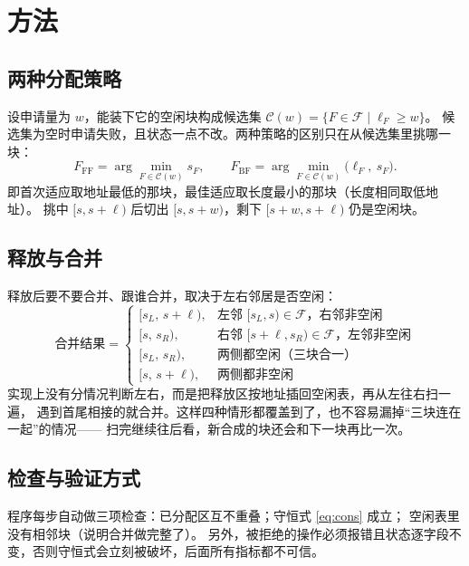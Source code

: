 \documentclass[12pt,a4paper]{ctexart}
\begin{document}
\clearpage
\section{方法}

\subsection{两种分配策略}

设申请量为 $w$，能装下它的空闲块构成候选集
$\mathcal{C}(w)=\{F\in\mathcal{F}\mid \ell_F\ge w\}$。
候选集为空时申请失败，且状态一点不改。两种策略的区别只在从候选集里挑哪一块：
\begin{equation}
    F_{\mathrm{FF}} = \arg\min_{F\in\mathcal{C}(w)} s_F ,
    \qquad
    F_{\mathrm{BF}} = \arg\min_{F\in\mathcal{C}(w)} \bigl(\ell_F,\ s_F\bigr).
    \label{eq:rule}
\end{equation}
即首次适应取地址最低的那块，最佳适应取长度最小的那块（长度相同取低地址）。
挑中 $[s,s+\ell)$ 后切出 $[s,s+w)$，剩下 $[s+w,s+\ell)$ 仍是空闲块。

\subsection{释放与合并}

释放后要不要合并、跟谁合并，取决于左右邻居是否空闲：
\begin{equation}
\text{合并结果} =
\begin{cases}
[s_{L},\,s+\ell), & \text{左邻 } [s_{L},s)\in\mathcal{F} \text{，右邻非空闲} \\
[s,\,s_{R}), & \text{右邻 } [s+\ell,s_{R})\in\mathcal{F} \text{，左邻非空闲} \\
[s_{L},\,s_{R}), & \text{两侧都空闲（三块合一）} \\
[s,\,s+\ell), & \text{两侧都非空闲}
\end{cases}
\label{eq:merge}
\end{equation}
实现上没有分情况判断左右，而是把释放区按地址插回空闲表，再从左往右扫一遍，
遇到首尾相接的就合并。这样四种情形都覆盖到了，也不容易漏掉“三块连在一起”的情况——
扫完继续往后看，新合成的块还会和下一块再比一次。

\subsection{检查与验证方式}

程序每步自动做三项检查：已分配区互不重叠；守恒式 \eqref{eq:cons} 成立；
空闲表里没有相邻块（说明合并做完整了）。
另外，被拒绝的操作必须报错且状态逐字段不变，否则守恒式会立刻被破坏，后面所有指标都不可信。
\end{document}
